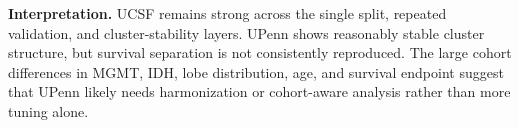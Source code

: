 \documentclass[11pt]{article}
\begin{document}
\noindent\textbf{Interpretation.}
UCSF remains strong across the single split, repeated validation, and cluster-stability layers. UPenn shows reasonably stable cluster structure, but survival separation is not consistently reproduced. The large cohort differences in MGMT, IDH, lobe distribution, age, and survival endpoint suggest that UPenn likely needs harmonization or cohort-aware analysis rather than more tuning alone.
\end{document}
